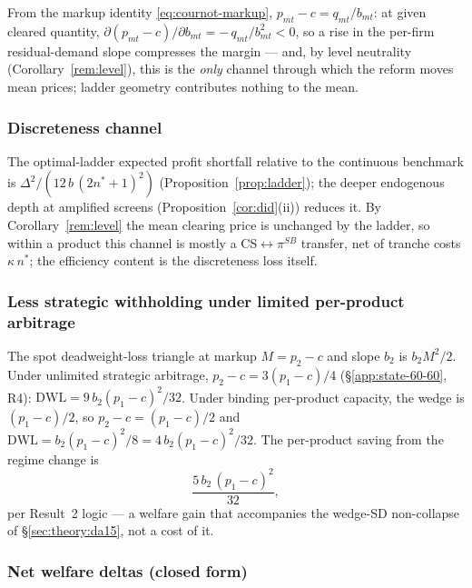 \documentclass[11pt,a4paper]{article}
\theoremstyle{definition}
\theoremstyle{remark}
\theoremstyle{plain}
\begin{document}
From the markup identity \eqref{eq:cournot-markup}, $p_{mt} - c = q_{mt}/b_{mt}$: at given cleared quantity, $\partial(p_{mt} - c)/\partial b_{mt} = -\,q_{mt}/b_{mt}^2 < 0$, so a rise in the per-firm residual-demand slope compresses the margin --- and, by level neutrality (Corollary~\ref{rem:level}), this is the \emph{only} channel through which the reform moves mean prices; ladder geometry contributes nothing to the mean.

\subsubsection{Discreteness channel}\label{app:welfare:quantization}

The optimal-ladder expected profit shortfall relative to the continuous benchmark is $\Delta^2/(12\, b\,(2 n^* + 1)^2)$ (Proposition~\ref{prop:ladder}); the deeper endogenous depth at amplified screens (Proposition~\ref{cor:did}(ii)) reduces it. By Corollary~\ref{rem:level} the mean clearing price is unchanged by the ladder, so within a product this channel is mostly a CS$\leftrightarrow\pi^{SB}$ transfer, net of tranche costs $\kappa\, n^*$; the efficiency content is the discreteness loss itself.

\subsubsection{Less strategic withholding under limited per-product arbitrage}\label{app:welfare:withholding}

The spot deadweight-loss triangle at markup $M = p_2 - c$ and slope $b_2$ is $b_2 M^2/2$. Under unlimited strategic arbitrage, $p_2 - c = 3(p_1 - c)/4$ (\S\ref{app:state-60-60}, R4): $\text{DWL} = 9\, b_2 (p_1 - c)^2/32$. Under binding per-product capacity, the wedge is $(p_1 - c)/2$, so $p_2 - c = (p_1 - c)/2$ and $\text{DWL} = b_2 (p_1 - c)^2/8 = 4\, b_2 (p_1 - c)^2/32$. The per-product saving from the regime change is
\[
\frac{5\, b_2\, (p_1 - c)^2}{32},
\]
per \citeauthor{ito_reguant_2016} Result~2 logic --- a welfare gain that accompanies the wedge-SD non-collapse of \S\ref{sec:theory:da15}, not a cost of it.

\subsubsection{Net welfare deltas (closed form)}\label{app:welfare:deltas}
\end{document}
